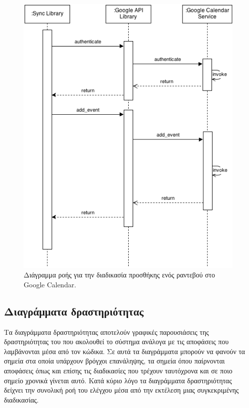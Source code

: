 \begin{figure}
\centering
\includegraphics[width=150mm]{images/sd-sync-appointment.png}
\caption{Διάγραμμα ροής για την διαδικασία προσθήκης ενός ραντεβού στο Google Calendar.}
\label{sd-save-appointment}
\end{figure}

\subsection{Διαγράμματα δραστηριότητας}
Τα διαγράμματα δραστηριότητας αποτελούν γραφικές παρουσιάσεις της δραστηριότητας του που ακολουθεί το σύστημα ανάλογα με τις αποφάσεις που λαμβάνονται μέσα από τον κώδικα. Σε αυτά τα διαγράμματα μπορούν να φανούν τα σημεία στα οποία υπάρχουν βρόγχοι επανάληψης, τα σημεία όπου παίρνονται αποφάσεις όπως και επίσης τις διαδικασίες που τρέχουν ταυτόχρονα και σε ποιο σημείο χρονικά γίνεται αυτό. Κατά κύριο λόγο τα διαγράμματα δραστηριότητας δείχνει την συνολική ροή του ελέγχου μέσα από την εκτέλεση μιας συγκεκριμένης διαδικασίας. 

